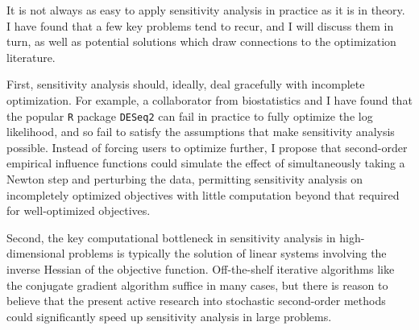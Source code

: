It is not always as easy to apply sensitivity analysis in practice as it is in
theory.  I have found that a few key problems tend to recur, and I will discuss
them in turn, as well as potential solutions which draw connections to the
optimization literature.

First, sensitivity analysis should, ideally, deal gracefully with incomplete
optimization.  For example, a collaborator from biostatistics and I have found
that the popular \texttt{R} package \texttt{DESeq2} can fail in practice to
fully optimize the log likelihood, and so fail to satisfy the assumptions that
make sensitivity analysis possible.  Instead of forcing users to optimize
further, I propose that second-order empirical influence functions could
simulate the effect of simultaneously taking a Newton step and perturbing the
data, permitting sensitivity analysis on incompletely optimized objectives with
little computation beyond that required for well-optimized objectives.

%
%

Second, the key computational bottleneck in sensitivity analysis in
high-dimensional problems is typically the solution of linear systems involving
the inverse Hessian of the objective function. Off-the-shelf iterative
algorithms like the conjugate gradient algorithm %
suffice in many cases, but there is reason to believe that the present active
research into stochastic second-order methods
could significantly speed up sensitivity analysis in large problems.

